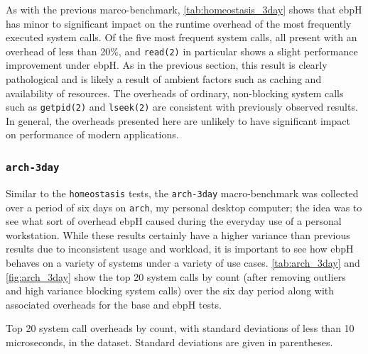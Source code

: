 \documentclass[
  12pt]{findlay}
\newcommand{\passthrough}[1]{#1}
\begin{document}
As with the previous marco-benchmark, \autoref{tab:homeostasis_3day}
shows that ebpH has minor to significant impact on the runtime overhead
of the most frequently executed system calls. Of the five most frequent
system calls, all present with an overhead of less than 20\%, and
\passthrough{\lstinline!read(2)!} in particular shows a slight
performance improvement under ebpH. As in the previous section, this
result is clearly pathological and is likely a result of ambient factors
such as caching and availability of resources. The overheads of
ordinary, non-blocking system calls such as
\passthrough{\lstinline!getpid(2)!} and
\passthrough{\lstinline!lseek(2)!} are consistent with previously
observed results. In general, the overheads presented here are unlikely
to have significant impact on performance of modern applications.

\hypertarget{arch-3day}{%
\subsubsection{\texorpdfstring{\texttt{arch-3day}}{arch-3day}}\label{arch-3day}}

\label{arch_3day}

Similar to the \passthrough{\lstinline!homeostasis!} tests, the
\passthrough{\lstinline!arch-3day!} macro-benchmark was collected over a
period of six days on \passthrough{\lstinline!arch!}, my personal
desktop computer; the idea was to see what sort of overhead ebpH caused
during the everyday use of a personal workstation. While these results
certainly have a higher variance than previous results due to
inconsistent usage and workload, it is important to see how ebpH behaves
on a variety of systems under a variety of use cases.
\autoref{tab:arch_3day} and \autoref{fig:arch_3day} show the top 20
system calls by count (after removing outliers and high variance
blocking system calls) over the six day period along with associated
overheads for the base and ebpH tests.

\begin{table}
    \caption[Top 20 system call overheads by count in the  dataset]{
        Top 20 system call overheads by count, with standard deviations of less than 10 microseconds,
        in the  dataset.
        Standard deviations are given in parentheses.
    }
    \label{tab:arch_3day}
    \resizebox{\columnwidth}{!}{
    
    }
\end{table}
\end{document}
